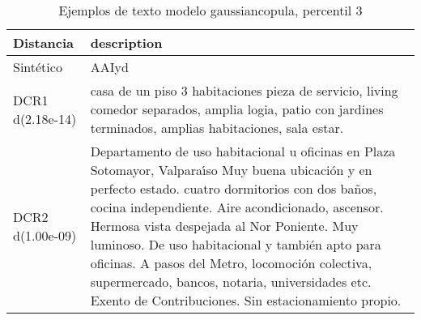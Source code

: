 \begin{table}[H]
\centering
\fontsize{10}{14}\selectfont
\caption{Ejemplos de texto modelo gaussiancopula, percentil 3}
\label{table-example-economicos-b-2-gaussiancopula-3p-text}
\begin{tabular}{|l|m{35em}|}
\hline
\rowcolor[gray]{0.8}
Distancia & description \\
\hline Sintético & AAIyd \\
\hline DCR1 d(2.18e-14) & casa de un piso 3 habitaciones pieza de servicio, living comedor separados, amplia logia, patio con jardines terminados, amplias habitaciones, sala estar. \\
\hline DCR2 d(1.00e-09) & Departamento de uso habitacional u oficinas en Plaza Sotomayor, Valpara{\'\i}so
Muy buena ubicaci\'on y en perfecto estado.
cuatro dormitorios con dos ba\~nos, cocina independiente.
Aire acondicionado, ascensor.
Hermosa vista despejada al Nor  Poniente. Muy luminoso. 
De uso habitacional y tambi\'en apto para oficinas. A pasos del Metro, locomoci\'on colectiva, supermercado, bancos, notaria, universidades etc.
Exento de Contribuciones.
Sin estacionamiento propio.
 \\
\hline
\end{tabular}
\end{table}
